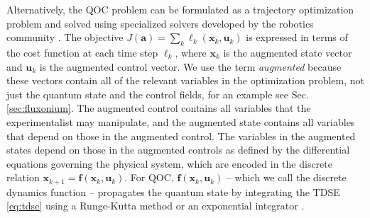 \documentclass[
  amsfonts,
  amsmath,
  amssymb,
  pra,
  twocolumn,
  superscriptaddress,
]{revtex4-2}
\begin{document}
Alternatively, the QOC problem can be formulated as a trajectory optimization problem 
and solved using specialized solvers developed by the robotics community
\cite{Schulman13, Tedrake16, Hereid2017FROST, howell2019altro}.
The objective $J(\mathbf{a})=\sum_k \ell_{k}(\mathbf{x}_{k}, \mathbf{u}_{k})$
is expressed in terms of the
cost function at each time step $\ell_k$, where
$\mathbf{x}_{k}$ is the augmented state vector
and $\mathbf{u}_{k}$ is the augmented control vector.
We use the term \emph{augmented} because these
vectors contain all of the relevant variables in the optimization problem,
not just the quantum state and the control fields,
for an example see Sec. \ref{sec:fluxonium}.
The augmented control contains all variables that the experimentalist
may manipulate, and the augmented state contains all variables that depend
on those in the augmented control.
The variables in the augmented states depend on those in the augmented
controls as defined by the differential equations governing the physical system, which are
encoded in the discrete relation
$\mathbf{x}_{k + 1} = \mathbf{f}(\mathbf{x}_{k}, \mathbf{u}_{k})$.
For QOC, $\mathbf{f}(\mathbf{x}_{k}, \mathbf{u}_{k})$ -- which we call
the discrete dynamics function -- propagates the quantum state by
integrating the TDSE \eqref{eq:tdse}
using a Runge-Kutta method \cite{jorgensen2011numerical}
or an exponential integrator \cite{auer2018magnus, berland2006solving, einkemmer2017performance,
  shillito2020fast}.
\end{document}
